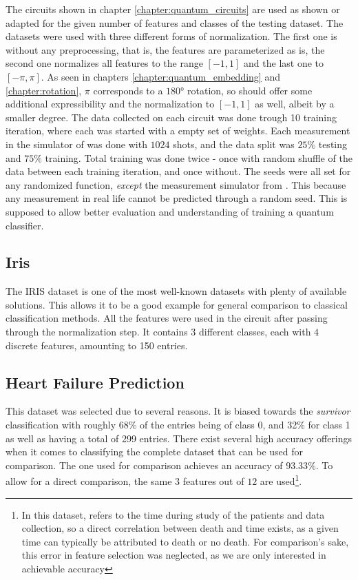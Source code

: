 The circuits shown in chapter \ref{chapter:quantum_circuits} are used as shown or adapted for the given number of features and classes of the testing dataset. The datasets were used with three different forms of normalization. The first one is without any preprocessing, that is, the features are parameterized as is, the second one normalizes all features to the range $[-1,1]$ and the last one to  $[-\pi,\pi]$. As seen in chapters \ref{chapter:quantum_embedding} and \ref{chapter:rotation}, $\pi$ corresponds to a $180°$ rotation, so should offer some additional expressibility and the normalization to $[-1,1]$ as well, albeit by a smaller degree. The data collected on each circuit was done trough 10 training iteration, where each was started with a empty set of weights. Each measurement in the simulator of  was done with $1024$ shots, and the data split was $25\%$ testing and $75\%$ training. Total training was done twice - once with random shuffle of the data between each training iteration, and once without. The seeds were all set for any randomized function, \emph{except} the measurement simulator from . This because any measurement in real life cannot be predicted through a random seed. This is supposed to allow better evaluation and understanding of training a quantum classifier.


\subsection{Iris}
\label{chapter:iris}

The IRIS \cite{fisher_use_1936} dataset is one of the most well-known datasets with plenty of available solutions. This allows it to be a good example for general comparison to classical classification methods. All the features were used in the circuit after passing through the normalization step. It contains $3$ different classes, each with $4$ discrete features, amounting to 150 entries.

\subsection{Heart Failure Prediction}
\label{chapter:heart_failure_prediction}

This dataset \cite{ahmad_survival_2017} was selected due to several reasons. It is biased towards the \emph{survivor} classification with roughly 68\% of the entries being of class 0, and 32\% for class 1 as well as having a total of 299 entries. There exist several high accuracy offerings when it comes to classifying the complete dataset that can be used for comparison. The one used for comparison\cite{sakhiya_heart_nodate} achieves an accuracy of $93.33\%$. To allow for a direct comparison, the same $3$ features out of $12$ are used\footnote{In this dataset,  refers to the time during study of the patients and data collection, so a direct correlation between death and time exists, as a given time can typically be attributed to death or no death. For comparison’s sake, this error in feature selection was neglected, as we are only interested in achievable accuracy}.

